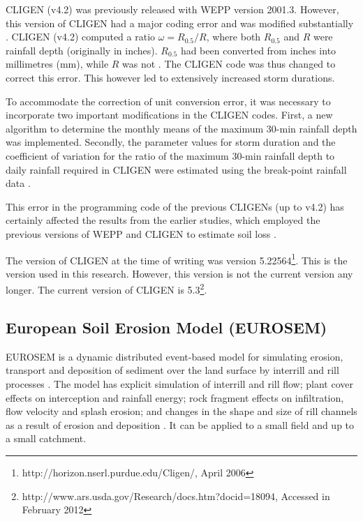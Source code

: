 CLIGEN (v4.2) was previously released with WEPP version 2001.3. However,
this version of CLIGEN had a major coding error and was modified substantially
\citep{yu2000-301}. CLIGEN (v4.2) computed a ratio $\omega = R_{0.5}/R$,
where both $R_{0.5}$ and $R$ were rainfall depth (originally in inches).
$R_{0.5}$ had been converted from inches into millimetres (mm), while $R$ was
not \citep{yu2000-301}. The CLIGEN code was thus changed to correct this error.
This however led to extensively increased storm durations.

To accommodate the correction of unit conversion error, it was necessary to
incorporate two important modifications in the CLIGEN codes. First, a new
algorithm to determine the monthly means of the maximum 30-min rainfall depth
was implemented. Secondly, the parameter values for storm duration and the
coefficient of variation for the ratio of the maximum 30-min rainfall depth to
daily rainfall required in CLIGEN were estimated using the break-point rainfall
data \citep{yu2000-301}.

This error in the programming code of the previous CLIGENs (up to v4.2) has
certainly affected the results from the earlier studies, which employed the
previous versions of WEPP and CLIGEN to estimate soil loss
\citep{truman1993-405,zhang1995-1069,zhang1995-1079,zhang1996-855,
baffaut1996-447,laflen1997-96,baffaut1998-756,favis-mortlock1999-329}.

The version of CLIGEN at the time of writing was version
5.22564\footnote{http://horizon.nserl.purdue.edu/Cligen/, April 2006}. This is
the version used in this research. However, this version is not the current
version any longer. The current version of CLIGEN is
5.3\footnote{http://www.ars.usda.gov/Research/docs.htm?docid=18094, Accessed in
February 2012}.

\subsection{European Soil Erosion Model (EUROSEM)}
\label{sec:EuropeanSoilErosionModelEUROSEM}

EUROSEM is a dynamic distributed event-based model for simulating erosion,
transport and deposition of sediment over the land surface by interrill and rill
processes \citep{morgan1998-389}. The model has explicit simulation of interrill
and rill flow; plant cover effects on interception and rainfall energy; rock
fragment effects on infiltration, flow velocity and splash erosion; and changes
in the shape and size of rill channels as a result of erosion and deposition
\citep{morgan1998-389}. It can be applied to a small field and up to a small
catchment.

